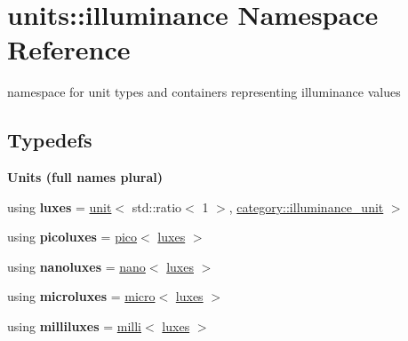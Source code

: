 \hypertarget{namespaceunits_1_1illuminance}{}\section{units\+:\+:illuminance Namespace Reference}
\label{namespaceunits_1_1illuminance}


namespace for unit types and containers representing illuminance values  


\subsection*{Typedefs}
\begin{Indent}{\bf Units (full names plural)}\par
\begin{DoxyCompactItemize}
\item 
\hypertarget{namespaceunits_1_1illuminance_acc93cc9405d7cd3d4654a3f68807e107}{}using {\bfseries luxes} = \hyperlink{structunits_1_1unit}{unit}$<$ std\+::ratio$<$ 1 $>$, \hyperlink{namespaceunits_1_1category_aaec672317a59eeaeac88c0be6bcea12c}{category\+::illuminance\+\_\+unit} $>$\label{namespaceunits_1_1illuminance_acc93cc9405d7cd3d4654a3f68807e107}

\item 
\hypertarget{namespaceunits_1_1illuminance_a75accbcdc5e440a207fb9ddfed88383c}{}using {\bfseries picoluxes} = \hyperlink{group___unit_manipulators_ga82a8d14a3e0877a375a66b64c45baab9}{pico}$<$ \hyperlink{structunits_1_1unit}{luxes} $>$\label{namespaceunits_1_1illuminance_a75accbcdc5e440a207fb9ddfed88383c}

\item 
\hypertarget{namespaceunits_1_1illuminance_a37bb248af3cdd3d4ec542479e9f90543}{}using {\bfseries nanoluxes} = \hyperlink{group___unit_manipulators_ga1c25c3c1d6c1f3aed3fd1ecf043110d5}{nano}$<$ \hyperlink{structunits_1_1unit}{luxes} $>$\label{namespaceunits_1_1illuminance_a37bb248af3cdd3d4ec542479e9f90543}

\item 
\hypertarget{namespaceunits_1_1illuminance_a9fa3955273610af59e10c4a92d220767}{}using {\bfseries microluxes} = \hyperlink{group___unit_manipulators_gaea53c906ec805110b93f02db4a961971}{micro}$<$ \hyperlink{structunits_1_1unit}{luxes} $>$\label{namespaceunits_1_1illuminance_a9fa3955273610af59e10c4a92d220767}

\item 
\hypertarget{namespaceunits_1_1illuminance_abcd57ce3af7f06a5d39c1814ea0a09a2}{}using {\bfseries milliluxes} = \hyperlink{group___unit_manipulators_gaec9d1c320e180eb59f3cb3094d8079dd}{milli}$<$ \hyperlink{structunits_1_1unit}{luxes} $>$\label{namespaceunits_1_1illuminance_abcd57ce3af7f06a5d39c1814ea0a09a2}


\end{DoxyCompactItemize}
\end{Indent}
